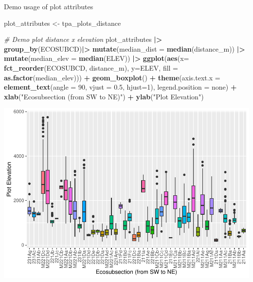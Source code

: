 \documentclass[
]{book}
\newenvironment{Shaded}{\begin{snugshade}}{\end{snugshade}}
\newcommand{\AttributeTok}[1]{\textcolor[rgb]{0.13,0.29,0.53}{#1}}
\newcommand{\CommentTok}[1]{\textcolor[rgb]{0.56,0.35,0.01}{\textit{#1}}}
\newcommand{\DecValTok}[1]{\textcolor[rgb]{0.00,0.00,0.81}{#1}}
\newcommand{\FloatTok}[1]{\textcolor[rgb]{0.00,0.00,0.81}{#1}}
\newcommand{\FunctionTok}[1]{\textcolor[rgb]{0.13,0.29,0.53}{\textbf{#1}}}
\newcommand{\NormalTok}[1]{#1}
\newcommand{\OtherTok}[1]{\textcolor[rgb]{0.56,0.35,0.01}{#1}}
\newcommand{\SpecialCharTok}[1]{\textcolor[rgb]{0.81,0.36,0.00}{\textbf{#1}}}
\newcommand{\StringTok}[1]{\textcolor[rgb]{0.31,0.60,0.02}{#1}}
\begin{document}
Demo usage of plot attributes

\begin{Shaded}
\begin{Highlighting}[]
\NormalTok{plot\_attributes }\OtherTok{\textless{}{-}}\NormalTok{ tpa\_plots\_distance}

\CommentTok{\# Demo plot distance x elevation}
\NormalTok{plot\_attributes }\SpecialCharTok{|\textgreater{}}
  \FunctionTok{group\_by}\NormalTok{(ECOSUBCD)}\SpecialCharTok{|\textgreater{}}
  \FunctionTok{mutate}\NormalTok{(}\AttributeTok{median\_dist =} \FunctionTok{median}\NormalTok{(distance\_m)) }\SpecialCharTok{|\textgreater{}}
  \FunctionTok{mutate}\NormalTok{(}\AttributeTok{median\_elev =} \FunctionTok{median}\NormalTok{(ELEV)) }\SpecialCharTok{|\textgreater{}}
  \FunctionTok{ggplot}\NormalTok{(}\FunctionTok{aes}\NormalTok{(}\AttributeTok{x=} \FunctionTok{fct\_reorder}\NormalTok{(ECOSUBCD, distance\_m), }
             \AttributeTok{y=}\NormalTok{ELEV, }
             \AttributeTok{fill =} \FunctionTok{as.factor}\NormalTok{(median\_elev))) }\SpecialCharTok{+}
  \FunctionTok{geom\_boxplot}\NormalTok{() }\SpecialCharTok{+}
  \FunctionTok{theme}\NormalTok{(}\AttributeTok{axis.text.x =} \FunctionTok{element\_text}\NormalTok{(}\AttributeTok{angle =} \DecValTok{90}\NormalTok{, }\AttributeTok{vjust =} \FloatTok{0.5}\NormalTok{, }\AttributeTok{hjust=}\DecValTok{1}\NormalTok{),}
        \AttributeTok{legend.position =} \StringTok{\textquotesingle{}none\textquotesingle{}}\NormalTok{) }\SpecialCharTok{+}
  \FunctionTok{xlab}\NormalTok{(}\StringTok{"Ecosubsection (from SW to NE)"}\NormalTok{) }\SpecialCharTok{+} \FunctionTok{ylab}\NormalTok{(}\StringTok{"Plot Elevation"}\NormalTok{) }
\end{Highlighting}
\end{Shaded}

\includegraphics{_main_files/figure-latex/plot-attributes-1.pdf}
\end{document}
